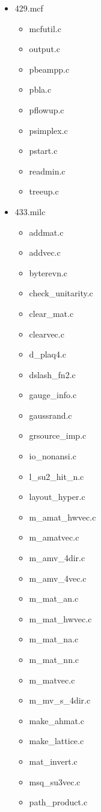 \begin{multicols}{3}
\begin{itemize}
	\item 429.mcf
	\begin{itemize}
		\item mcfutil.c
		\item output.c
		\item pbeampp.c
		\item pbla.c
		\item pflowup.c
		\item psimplex.c
		\item pstart.c
		\item readmin.c
		\item treeup.c
	\end{itemize}

	\item 433.milc
	\begin{itemize}
		\item addmat.c
		\item addvec.c
		\item byterevn.c
		\item check\_unitarity.c
		\item clear\_mat.c
		\item clearvec.c
		\item d\_plaq4.c
		\item dslash\_fn2.c
		\item gauge\_info.c
		\item gaussrand.c
		\item grsource\_imp.c
		\item io\_nonansi.c
		\item l\_su2\_hit\_n.c
		\item layout\_hyper.c
		\item m\_amat\_hwvec.c
		\item m\_amatvec.c
		\item m\_amv\_4dir.c
		\item m\_amv\_4vec.c
		\item m\_mat\_an.c
		\item m\_mat\_hwvec.c
		\item m\_mat\_na.c
		\item m\_mat\_nn.c
		\item m\_matvec.c
		\item m\_mv\_s\_4dir.c
		\item make\_ahmat.c
		\item make\_lattice.c
		\item mat\_invert.c
		\item msq\_su3vec.c
		\item path\_product.c

\end{itemize}
\end{itemize}
\end{multicols}
